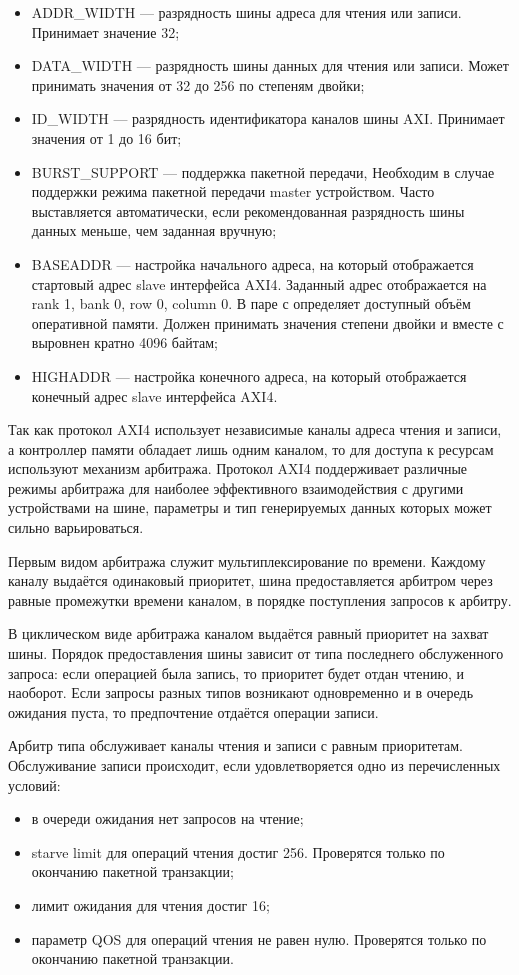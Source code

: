 \begin{itemize}
  \item ADDR\_WIDTH --- разрядность шины адреса для чтения или записи. Принимает значение 32;
  \item DATA\_WIDTH --- разрядность шины данных для чтения или записи. Может принимать значения
    от 32 до 256 по степеням двойки;
  \item ID\_WIDTH --- разрядность идентификатора каналов шины AXI. Принимает значения от 1 до 16 бит;
  \item BURST\_SUPPORT --- поддержка пакетной передачи, Необходим в случае поддержки режима пакетной передачи
    master устройством. Часто выставляется автоматически, если рекомендованная разрядность шины данных
    меньше, чем заданная вручную;
  \item BASEADDR --- настройка начального адреса, на который отображается стартовый адрес slave интерфейса
    AXI4. Заданный адрес отображается на rank 1, bank 0, row 0, column 0. В паре с  определяет
    доступный объём оперативной памяти. Должен принимать значения степени двойки и вместе с  выровнен
    кратно 4096 байтам;
  \item HIGHADDR --- настройка конечного адреса, на который отображается конечный адрес slave интерфейса
    AXI4.
\end{itemize}

Так как протокол AXI4 использует независимые каналы адреса чтения и записи, а контроллер памяти
обладает лишь одним каналом, то для доступа к ресурсам используют механизм арбитража.
Протокол AXI4 поддерживает различные режимы арбитража для наиболее эффективного взаимодействия с
другими устройствами на шине, параметры и тип генерируемых данных которых может сильно варьироваться.

Первым видом арбитража служит мультиплексирование по времени. Каждому каналу выдаётся одинаковый приоритет,
шина предоставляется арбитром через равные промежутки времени каналом, в порядке поступления запросов к арбитру.

В циклическом виде арбитража каналом выдаётся равный приоритет на захват шины. Порядок предоставления шины
зависит от типа последнего обслуженного запроса: если операцией была запись, то приоритет будет отдан чтению,
и наоборот. Если запросы разных типов возникают одновременно и в очередь ожидания пуста, то предпочтение
отдаётся операции записи.

Арбитр типа  обслуживает каналы чтения и записи с равным приоритетам.
Обслуживание записи происходит, если удовлетворяется одно из перечисленных условий:
\begin{itemize}
  \item в очереди ожидания нет запросов на чтение;
  \item starve limit для операций чтения достиг 256. Проверятся только по окончанию пакетной транзакции;
  \item лимит ожидания для чтения достиг 16;
  \item параметр QOS для операций чтения не равен нулю. Проверятся только по окончанию пакетной транзакции.
\end{itemize}

